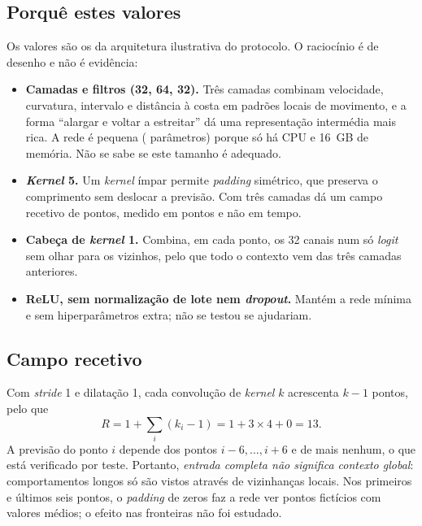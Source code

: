 \documentclass{article}
\newcommand{\revtext}[2]{{\color{#1}#2}}
\begin{document}
\subsection{\texorpdfstring{Porquê estes valores}{Porquê estes valores}}

\revtext{rev052}{Os valores são os da arquitetura ilustrativa do protocolo. O raciocínio é de desenho e não é evidência:
\begin{itemize}
\item \textbf{Camadas e filtros (32, 64, 32).} Três camadas combinam velocidade, curvatura, intervalo e distância à costa em padrões locais de movimento, e a forma ``alargar e voltar a estreitar'' dá uma representação intermédia mais rica. A rede é pequena (\resModParametros{} parâmetros) porque só há CPU e 16~GB de memória. Não se sabe se este tamanho é adequado.
\item \textbf{\emph{Kernel} 5.} Um \emph{kernel} ímpar permite \emph{padding} simétrico, que preserva o comprimento sem deslocar a previsão. Com três camadas dá um campo recetivo de \resModCampo{} pontos, medido em pontos e não em tempo.
\item \textbf{Cabeça de \emph{kernel} 1.} Combina, em cada ponto, os 32 canais num só \emph{logit} sem olhar para os vizinhos, pelo que todo o contexto vem das três camadas anteriores.
\item \textbf{ReLU, sem normalização de lote nem \emph{dropout}.} Mantém a rede mínima e sem hiperparâmetros extra; não se testou se ajudariam.
\end{itemize}}

\subsection{\texorpdfstring{Campo recetivo}{Campo recetivo}}
\label{sec:campo-recetivo}

\revtext{rev052}{Com \emph{stride} 1 e dilatação 1, cada convolução de \emph{kernel} $k$ acrescenta $k-1$ pontos, pelo que
\begin{equation}
R = 1+\sum_{i}(k_i-1) = 1+3\times4+0 = 13 .
\end{equation}
A previsão do ponto $i$ depende dos pontos $i-6,\dots,i+6$ e de mais nenhum, o que está verificado por teste. Portanto, \emph{entrada completa não significa contexto global}: comportamentos longos só são vistos através de vizinhanças locais. Nos primeiros e últimos seis pontos, o \emph{padding} de zeros faz a rede ver pontos fictícios com valores médios; o efeito nas fronteiras não foi estudado.}
\end{document}
